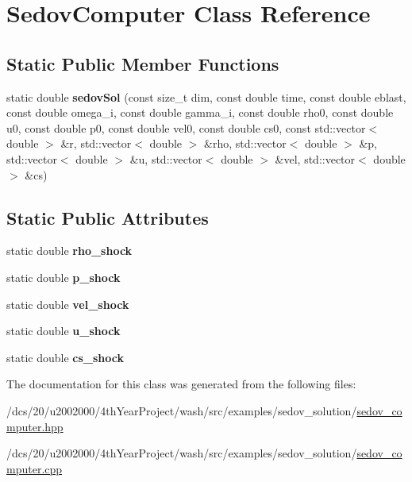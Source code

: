 \hypertarget{classSedovComputer}{}\section{Sedov\+Computer Class Reference}
\label{classSedovComputer}
\subsection*{Static Public Member Functions}
\begin{DoxyCompactItemize}
\item 
\mbox{\label{classSedovComputer_a5aa65182382334ed24bf803e60967795}} 
static double {\bfseries sedov\+Sol} (const size\+\_\+t dim, const double time, const double eblast, const double omega\+\_\+i, const double gamma\+\_\+i, const double rho0, const double u0, const double p0, const double vel0, const double cs0, const std\+::vector$<$ double $>$ \&r, std\+::vector$<$ double $>$ \&rho, std\+::vector$<$ double $>$ \&p, std\+::vector$<$ double $>$ \&u, std\+::vector$<$ double $>$ \&vel, std\+::vector$<$ double $>$ \&cs)
\end{DoxyCompactItemize}
\subsection*{Static Public Attributes}
\begin{DoxyCompactItemize}
\item 
\mbox{\label{classSedovComputer_a3a79b1c2c435337f92488129f15ad323}} 
static double {\bfseries rho\+\_\+shock}
\item 
\mbox{\label{classSedovComputer_aaca1a1a129526f6861d9c219a025ed56}} 
static double {\bfseries p\+\_\+shock}
\item 
\mbox{\label{classSedovComputer_ac8e574be46eb693b095e85c5d157bffb}} 
static double {\bfseries vel\+\_\+shock}
\item 
\mbox{\label{classSedovComputer_a597b5c8321e0737b514ddb121844053d}} 
static double {\bfseries u\+\_\+shock}
\item 
\mbox{\label{classSedovComputer_afd12699016e5eb9bc8c2c42ca4fb00bd}} 
static double {\bfseries cs\+\_\+shock}
\end{DoxyCompactItemize}


The documentation for this class was generated from the following files\+:\begin{DoxyCompactItemize}
\item 
/dcs/20/u2002000/4th\+Year\+Project/wash/src/examples/sedov\+\_\+solution/\mbox{\hyperlink{sedov__computer_8hpp}{sedov\+\_\+computer.\+hpp}}\item 
/dcs/20/u2002000/4th\+Year\+Project/wash/src/examples/sedov\+\_\+solution/\mbox{\hyperlink{sedov__computer_8cpp}{sedov\+\_\+computer.\+cpp}}\end{DoxyCompactItemize}
